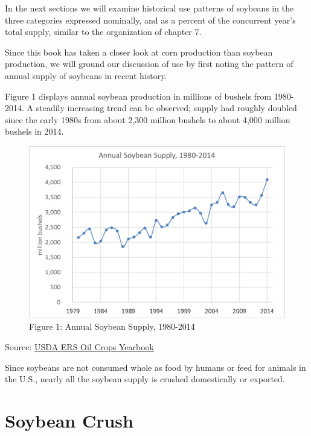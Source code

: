 \documentclass[
  letterpaper,
  DIV=11,
  numbers=noendperiod]{scrreprt}
\begin{document}
In the next sections we will examine historical use patterns of soybeans
in the three categories expressed nominally, and as a percent of the
concurrent year's total supply, similar to the organization of chapter
7.

Since this book has taken a closer look at corn production than soybean
production, we will ground our discussion of use by first noting the
pattern of annual supply of soybeans in recent history.

Figure 1 displays annual soybean production in millions of bushels from
1980-2014. A steadily increasing trend can be observed; supply had
roughly doubled since the early 1980s from about 2,300 million bushels
to about 4,000 million bushels in 2014.

\begin{figure}

{\centering \includegraphics{Excel-files/ForecastingUseSoy-OilCropsYearbook_files/image013.png}

}

\caption{Figure 1: Annual Soybean Supply, 1980-2014}

\end{figure}

Source:
\href{http://www.ers.usda.gov/data-products/oil-crops-yearbook.aspx}{USDA
ERS Oil Crops Yearbook}

Since soybeans are not consumed whole as food by humans or feed for
animals in the U.S., nearly all the soybean supply is crushed
domestically or exported.

\hypertarget{soybean-crush}{%
\section{Soybean Crush}\label{soybean-crush}}
\end{document}
